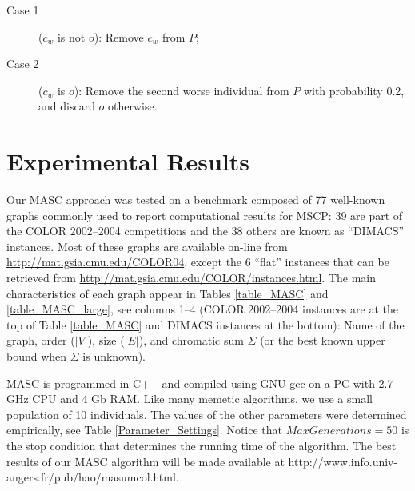 \documentclass{elsart}
\begin{document}
\begin{description}
\item[Case 1] ($c_w$ is not $o$): Remove $c_w$ from $P$;
\item[Case 2] ($c_w$ is $o$): Remove the second worse individual from $P$ with probability 0.2, and discard $o$ otherwise.
\end{description}

\section{Experimental Results}
\label{Sec_Results}

Our MASC approach was tested on a benchmark composed of 77 well-known graphs commonly used to report computational results for MSCP: 39 are part of the COLOR 2002--2004 competitions and the 38 others are known as ``DIMACS'' instances. Most of these graphs are available on-line from \url{http://mat.gsia.cmu.edu/COLOR04}, except the 6 ``flat'' instances that can be retrieved from \url{http://mat.gsia.cmu.edu/COLOR/instances.html}. The main characteristics of each graph appear in Tables \ref{table_MASC} and \ref{table_MASC_large}, see columns 1--4 (COLOR 2002--2004 instances are at the top of Table \ref{table_MASC} and DIMACS instances at the bottom): Name of the graph, order ($|V|$), size ($|E|$), and chromatic sum $\Sigma$ (or the best known upper bound when $\Sigma$ is unknown).

MASC is programmed in C++ and compiled using GNU gcc on a PC with 2.7 GHz CPU and 4 Gb RAM. Like many memetic algorithms, we use a small population of 10 individuals. The values of the other parameters were determined empirically, see Table \ref{Parameter_Settings}. Notice that $MaxGenerations = 50$ is the stop condition that determines the running time of the algorithm. The best results of our MASC algorithm will be made available at http://www.info.univ-angers.fr/pub/hao/masumcol.html.
\end{document}
